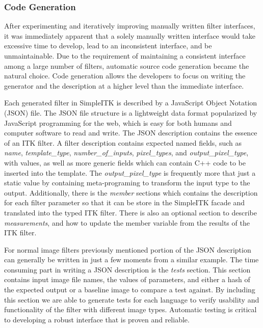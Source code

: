 \documentclass{frontiersMED} %
\begin{document}
\subsubsection{Code Generation}
After experimenting and iteratively improving manually written filter
interfaces, it was immediately apparent that a solely manually written
interface would take excessive time to develop, lead to an
inconsistent interface, and be unmaintainable. Due to the requirement
of maintaining a consistent interface among a large number of filters,
automatic source code generation became the natural choice. Code
generation allows the developers to focus on writing the generator and
the description at a higher level than the immediate interface.

Each generated filter in SimpleITK is described by a JavaScript Object
Notation (JSON) file. The JSON file structure is a lightweight data
format popularized by JavaScript programming for the web, which is
easy for both humans and computer software to read and write. The JSON
description contains the essence of an ITK filter. A filter
description contains expected named fields, such as \textit{name},
\textit{template\_type}, \textit{number\_of\_inputs},
\textit{pixel\_types}, and \textit{output\_pixel\_type}, with
values, as well as more generic fields which can contain C++ code to
be inserted into the template. The \textit{output\_pixel\_type} is
frequently more that just a static value by containing meta-programing
to transform the input type to the output. Additionally, there is the
\textit{member} sections which contains the description for each filter
parameter so that it can be store in the SimpleITK facade and
translated into the typed ITK filter. There is also an optional
section to describe \textit{measurements}, and how to update the member
variable from the results of the ITK filter.

For normal image filters previously mentioned portion of the JSON
description can generally be written in just a few moments from a
similar example. The time consuming part in writing a JSON description
is the \textit{tests} section. This section contains input image file names,
the values of parameters, and either a hash of the expected output or
a baseline image to compare a test against. By including this section
we are able to generate tests for each language to verify usability
and functionality of the filter with different image types. Automatic
testing is critical to developing a robust interface that is proven
and reliable.
\end{document}
